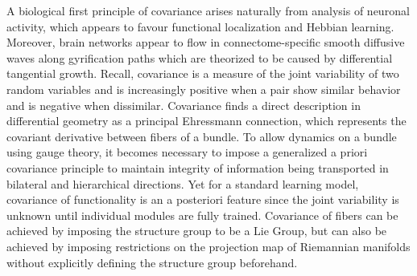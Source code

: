 \documentclass{article}
\begin{document}
    
   A biological first principle of covariance arises naturally from analysis of neuronal activity, which appears to favour functional localization and Hebbian learning.
    Moreover, brain networks appear to flow in connectome-specific smooth diffusive waves along gyrification paths which are theorized to be caused by differential tangential growth. 
    Recall, covariance is a measure of the joint variability of two random variables and is increasingly positive when a pair show similar behavior and is negative when dissimilar.
    Covariance finds a direct description in differential geometry as a principal Ehressmann connection, which represents the covariant derivative between fibers of a bundle. To allow dynamics on a bundle using gauge theory, it becomes necessary to impose a generalized a priori covariance principle to maintain integrity of information being transported in bilateral and hierarchical directions.
    Yet for a standard learning model, covariance of functionality is an a posteriori feature since the joint variability is unknown until individual modules are fully trained. 
    Covariance of fibers can be achieved by imposing the structure group to be a Lie Group, but can also be achieved by imposing restrictions on the projection map of Riemannian manifolds without explicitly defining the structure group beforehand.
    
    

    
    
\end{document}
